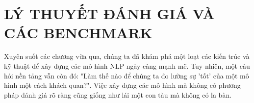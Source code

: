\chapter{LÝ THUYẾT ĐÁNH GIÁ VÀ CÁC BENCHMARK}
\label{chap:evaluation}

Xuyên suốt các chương vừa qua, chúng ta đã khám phá một loạt các kiến trúc và kỹ thuật để xây dựng các mô hình NLP ngày càng mạnh mẽ. Tuy nhiên, một câu hỏi nền tảng vẫn còn đó: "Làm thế nào để chúng ta đo lường sự 'tốt' của một mô hình một cách khách quan?". Việc xây dựng các mô hình mà không có phương pháp đánh giá rõ ràng cũng giống như lái một con tàu mà không có la bàn.